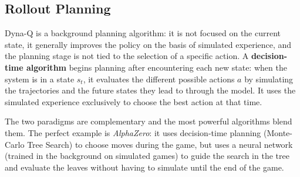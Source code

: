 \documentclass[10pt, a4paper]{report}
\begin{document}
\subsection{Rollout Planning}
Dyna-Q is a background planning algorithm: it is not focused on the current state, it generally improves the policy on the basis of simulated experience, and the planning stage is not tied to the selection of a specific action. A \textbf{decision-time algorithm} begins planning after encountering each new state: when the system is in a state $s_t$, it evaluates the different possible actions $a$ by simulating the trajectories and the future states they lead to through the model. It uses the simulated experience exclusively to choose the best action at that time.\bigskip 

The two paradigms are complementary and the most powerful algorithms blend them. The perfect example is \textit{AlphaZero}: it uses decision-time planning (Monte-Carlo Tree Search) to choose moves during the game, but uses a neural network (trained in the background on simulated games) to guide the search in the tree and evaluate the leaves without having to simulate until the end of the game.\bigskip
\end{document}
